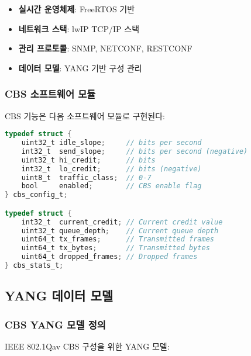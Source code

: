 \documentclass[twocolumn,10pt]{article}
\begin{document}
\begin{itemize}
    \item \textbf{실시간 운영체제}: FreeRTOS 기반
    \item \textbf{네트워크 스택}: lwIP TCP/IP 스택
    \item \textbf{관리 프로토콜}: SNMP, NETCONF, RESTCONF
    \item \textbf{데이터 모델}: YANG 기반 구성 관리
\end{itemize}

\subsubsection{CBS 소프트웨어 모듈}

CBS 기능은 다음 소프트웨어 모듈로 구현된다:

\begin{lstlisting}[language=C, caption=CBS 구성 구조체]
typedef struct {
    uint32_t idle_slope;     // bits per second
    int32_t  send_slope;     // bits per second (negative)
    uint32_t hi_credit;      // bits
    int32_t  lo_credit;      // bits (negative)
    uint8_t  traffic_class;  // 0-7
    bool     enabled;        // CBS enable flag
} cbs_config_t;

typedef struct {
    int32_t  current_credit; // Current credit value
    uint32_t queue_depth;    // Current queue depth
    uint64_t tx_frames;      // Transmitted frames
    uint64_t tx_bytes;       // Transmitted bytes
    uint64_t dropped_frames; // Dropped frames
} cbs_stats_t;
\end{lstlisting}

\subsection{YANG 데이터 모델}

\subsubsection{CBS YANG 모델 정의}

IEEE 802.1Qav CBS 구성을 위한 YANG 모델:
\end{document}
